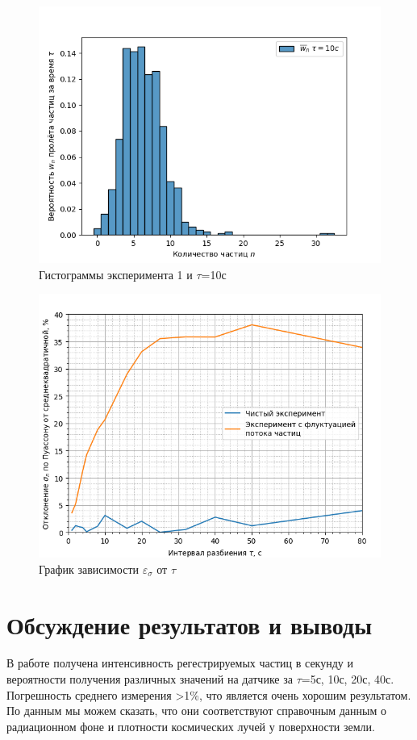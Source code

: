 \documentclass[12pt,a4paper]{article}
\begin{document}
\begin{figure}[!ht]
\includegraphics[width=\textwidth]{imgs/sus.png}
\caption{Гистограммы эксперимента 1 и $\tau$=10с}
\end{figure}
\begin{figure}[!ht]
\includegraphics[width=\textwidth]{imgs/sigma.png}
\caption{График зависимости $\varepsilon_{\sigma}$ от $\tau$}
\end{figure}

\clearpage
\section{ Обсуждение результатов и выводы}
В работе получена интенсивность регестрируемых частиц в секунду и вероятности получения различных значений на датчике за $\tau$=5с, 10с, 20с, 40с. Погрешность среднего измерения >1\%, что является очень хорошим результатом. По данным мы можем сказать, что они соответствуют справочным данным о радиационном фоне и плотности космических лучей у поверхности земли. 
\end{document}
